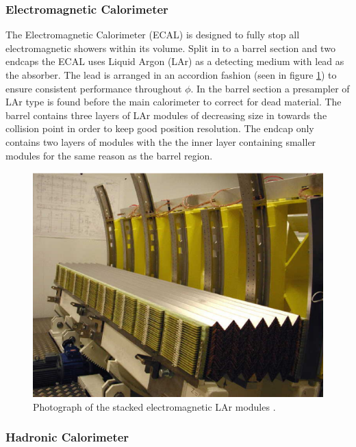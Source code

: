		\subsubsection*{Electromagnetic Calorimeter}

		The Electromagnetic Calorimeter (ECAL) is designed to fully stop all electromagnetic showers within its volume. Split in to a barrel section and two endcaps the ECAL uses Liquid Argon (LAr) as a detecting medium with lead as the absorber. The lead is arranged in an accordion fashion (seen in figure \ref{fig:ATLAS_calo_crack}) to ensure consistent performance throughout $\phi$. In the barrel section a presampler of LAr type is found before the main calorimeter to correct for dead material. The barrel contains three layers of LAr modules of decreasing size in towards the collision point in order to keep good position resolution. The endcap only contains two layers of modules with the the inner layer containing smaller modules for the same reason as the barrel region.


		\begin{figure}[h!]
			\begin{center}
				\includegraphics[width=0.95\linewidth]{images/LARG3-fig02-module00.eps}
			\end{center}
			\caption{Photograph of the stacked electromagnetic LAr modules \cite{Aad:1129811}.}
			\label{fig:ATLAS_calo_crack}
		\end{figure}


		\subsubsection*{Hadronic Calorimeter}


